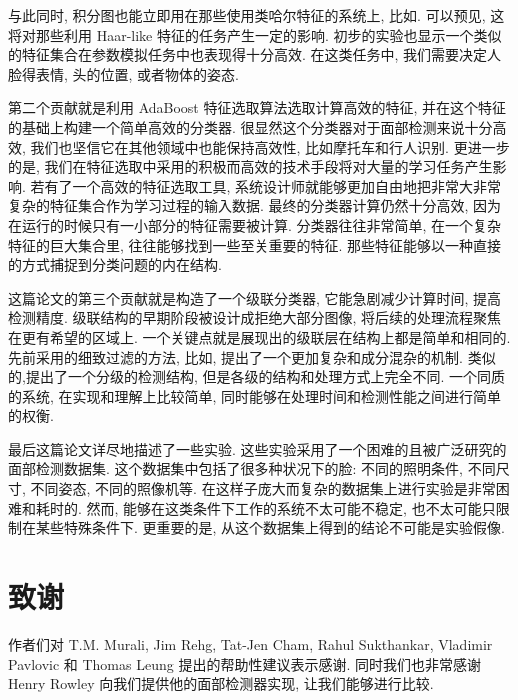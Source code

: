 \documentclass[a4paper,utf8,11pt, onecolumn]{ctexart}
\begin{document}
与此同时, 积分图也能立即用在那些使用类哈尔特征的系统上, 比如\citet{papageorgiou1998general}. 可以预见, 这将对那些利用 Haar-like 特征的任务产生一定的影响. 初步的实验也显示一个类似的特征集合在参数模拟任务中也表现得十分高效. 在这类任务中, 我们需要决定人脸得表情, 头的位置, 或者物体的姿态.

第二个贡献就是利用 AdaBoost 特征选取算法选取计算高效的特征, 并在这个特征的基础上构建一个简单高效的分类器. 很显然这个分类器对于面部检测来说十分高效, 我们也坚信它在其他领域中也能保持高效性, 比如摩托车和行人识别. 更进一步的是, 我们在特征选取中采用的积极而高效的技术手段将对大量的学习任务产生影响. 若有了一个高效的特征选取工具, 系统设计师就能够更加自由地把非常大非常复杂的特征集合作为学习过程的输入数据.
最终的分类器计算仍然十分高效, 因为在运行的时候只有一小部分的特征需要被计算. 分类器往往非常简单, 在一个复杂特征的巨大集合里, 往往能够找到一些至关重要的特征. 那些特征能够以一种直接的方式捕捉到分类问题的内在结构.

这篇论文的第三个贡献就是构造了一个级联分类器, 它能急剧减少计算时间, 提高检测精度. 级联结构的早期阶段被设计成拒绝大部分图像, 将后续的处理流程聚焦在更有希望的区域上. 一个关键点就是展现出的级联层在结构上都是简单和相同的.
先前采用的细致过滤的方法, 比如\citet{itti1998model}, 提出了一个更加复杂和成分混杂的机制. 类似的,\citet{amit1999computational}提出了一个分级的检测结构, 但是各级的结构和处理方式上完全不同. 一个同质的系统, 在实现和理解上比较简单, 同时能够在处理时间和检测性能之间进行简单的权衡.

最后这篇论文详尽地描述了一些实验. 这些实验采用了一个困难的且被广泛研究的面部检测数据集. 这个数据集中包括了很多种状况下的脸: 不同的照明条件, 不同尺寸, 不同姿态, 不同的照像机等. 在这样子庞大而复杂的数据集上进行实验是非常困难和耗时的. 然而, 能够在这类条件下工作的系统不太可能不稳定, 也不太可能只限制在某些特殊条件下. 更重要的是, 从这个数据集上得到的结论不可能是实验假像.
\section{致谢}
作者们对 T.M. Murali, Jim Rehg, Tat-Jen Cham, Rahul Sukthankar, Vladimir Pavlovic 和 Thomas Leung 提出的帮助性建议表示感谢. 同时我们也非常感谢 Henry Rowley 向我们提供他的面部检测器实现, 让我们能够进行比较.

\end{document}
